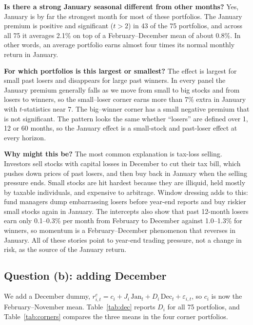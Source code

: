 \begin{tight}
  \item \textbf{Is there a strong January seasonal different from other months?} Yes, January
  is by far the strongest month for most of these portfolios. The January premium is positive
  and significant ($t>2$) in 43 of the 75 portfolios, and across all 75 it averages 2.1\% on
  top of a February--December mean of about 0.8\%. In other words, an average portfolio earns
  almost four times its normal monthly return in January.

  \item \textbf{For which portfolios is this largest or smallest?} The effect is largest for
  small past losers and disappears for large past winners. In every panel the January premium
  generally falls as we move from small to big stocks and from losers to winners, so the small--loser
  corner earns more than 7\% extra in January with $t$-statistics near 7. The big--winner
  corner has a small negative premium that is not significant. The pattern looks the same
  whether ``losers'' are defined over 1, 12 or 60 months, so the January effect is a
  small-stock and past-loser effect at every horizon.

  \item \textbf{Why might this be?} The most common explanation is tax-loss selling. Investors
  sell stocks with capital losses in December to cut their tax bill, which pushes down prices
  of past losers, and then buy back in January when the selling pressure ends. Small stocks are
  hit hardest because they are illiquid, held mostly by taxable individuals, and expensive to
  arbitrage. Window dressing adds to this: fund managers dump embarrassing losers before
  year-end reports and buy riskier small stocks again in January. The intercepts also show that
  past 12-month losers earn only 0.1--0.3\% per month from February to December against
  1.0--1.3\% for winners, so momentum is a February--December phenomenon that reverses in
  January. All of
  these stories point to year-end trading pressure, not a change in risk, as the source of the
  January return.
\end{tight}

\subsection*{Question (b): adding December}

We add a December dummy,
$r^e_{i,t} = c_i + J_i\,\mathrm{Jan}_t + D_i\,\mathrm{Dec}_t + \varepsilon_{i,t}$, so $c_i$ is
now the February--November mean. Table~\ref{tab:dec} reports $D_i$ for all 75 portfolios, and
Table~\ref{tab:corners} compares the three means in the four corner portfolios.

